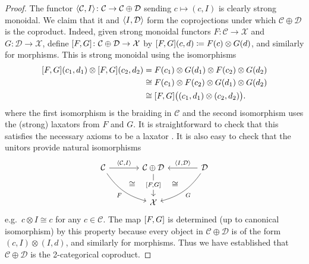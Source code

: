 \documentclass[11pt, oneside, article]{memoir}
\theoremstyle{plain}
\theoremstyle{definition}
\theoremstyle{remark}
\newcommand{\cat}[1]{\mathcal{#1}}%
\DeclarePairedDelimiter{\pair}{\langle}{\rangle}
\DeclarePairedDelimiter{\copair}{[}{]}
\newcommand{\hide}[2][]{#1}
\begin{document}
\begin{proof}
The functor $\pair{\cat{C},I}\colon\cat{C}\to\cat{C}\oplus\cat{D}$ sending $c\mapsto (c,I)$ is clearly strong monoidal. We claim that it and $\pair{I,\cat{D}}$ form the coprojections under which $\cat{C}\oplus\cat{D}$ is the coproduct. Indeed, given strong monoidal functors $F\colon\cat{C}\to\cat{X}$ and $G\colon\cat{D}\to\cat{X}$, define $\copair{F,G}\colon\cat{C}\oplus\cat{D}\to\cat{X}$ by $\copair{F,G}(c,d)\coloneqq F(c)\otimes G(d)$, and similarly for morphisms. This is strong monoidal using the isomorphisms
\begin{align*}
	\copair{F,G}(c_1,d_1)\otimes\copair{F,G}(c_2,d_2)&=
	F(c_1)\otimes G(d_1)\otimes F(c_2)\otimes G(d_2)\\&\cong
	F(c_1)\otimes F(c_2)\otimes G(d_1)\otimes G(d_2)\\&\cong
	\copair{F,G}\big((c_1,d_1)\otimes(c_2,d_2)\big).
\end{align*}
where the first isomorphism is the braiding in $\cat{C}$ and the second isomorphism uses the (strong) laxators from $F$ and $G$. It is straightforward to check that this satisfies the necessary axioms to be a laxator%
\hide[.]{
, e.g.\ the commutativity of the following diagram
\[
\begin{tikzcd}
	Fc_1\otimes Gd_1\otimes Fc_2\otimes Gd_2\otimes Fc_3\otimes Gd_3\ar[r, "\sigma"]\ar[d, "\sigma"']&
	Fc_1\otimes Gd_1\otimes Fc_2\otimes Fc_3\otimes Gd_2\otimes Gd_3\ar[d]\\
	Fc_1\otimes Fc_2\otimes Gc_1\otimes Gc_2\otimes Fc_3\otimes Gd_3\ar[d]&
	Fc_1\otimes Gd_1\otimes F(c_2\otimes c_3)\otimes G(d_2\otimes d_3)\ar[d, "\sigma"]\\
	F(c_1\otimes c_2)\otimes G(d_1\otimes d_2)\otimes Fc_3\otimes Gd_3\ar[d, "\sigma"']&
	Fc_1\otimes F(c_2\otimes c_3)\otimes Gd_1\otimes G(d_2\otimes d_3)\ar[d]\\
	F(c_1\otimes c_2)\otimes Fc_3\otimes G(d_1\otimes d_2)\otimes Gd_3\ar[r]&
	F(c_1\otimes c_2\otimes c_3)\otimes G(d_1\otimes d_2\otimes d_3)	
\end{tikzcd}
\]
}
It is also easy to check that the unitors provide natural isomorphisms
\begin{equation}\label{eqn.coproduct_smc}
\begin{tikzcd}[sep=large]
	\cat{C}\ar[r, "\pair{\cat{C},I}"]\ar[dr, bend right=20pt, "F"', "" name=F]&
	|[alias=CD]|\cat{C}\oplus\cat{D}\ar[d, "\copair{F,G}" description]&
	\cat{D}\ar[l, "\pair{I,\cat{D}}"']\ar[dl, bend left=20pt, "G", ""' name=G]\\&
	\cat{X}
	\ar[from=G, to=CD, phantom, near start, "\cong"]
	\ar[from=F, to=CD, phantom, near start, "\cong"]
\end{tikzcd}
\end{equation}
e.g.\ $c\otimes I\cong c$ for any $c\in\cat{C}$. The map $\copair{F,G}$ is determined (up to canonical isomorphism) by this property because every object in $\cat{C}\oplus\cat{D}$ is of the form $(c,I)\otimes(I,d)$, and similarly for morphisms. Thus we have established that $\cat{C}\oplus\cat{D}$ is the 2-categorical coproduct.


\end{proof}
\end{document}
